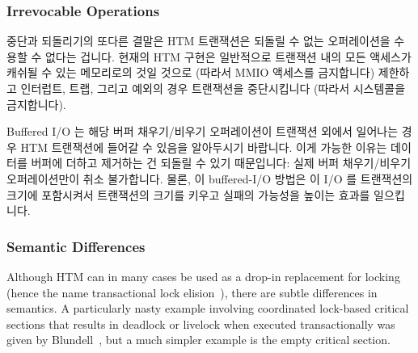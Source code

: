 \fi

\subsubsection{Irrevocable Operations}
\label{sec:future:Irrevocable Operations}

중단과 되돌리기의 또다른 결말은 HTM 트랜잭션은 되돌릴 수 없는 오퍼레이션을
수용할 수 없다는 겁니다.
현재의 HTM 구현은 일반적으로 트랜잭션 내의 모든 액세스가 캐쉬될 수 있는
메모리로의 것일 것으로 (따라서 MMIO 액세스를 금지합니다) 제한하고 인터럽트,
트랩, 그리고 예외의 경우 트랜잭션을 중단시킵니다 (따라서 시스템콜을
금지합니다).

Buffered I/O 는 해당 버퍼 채우기/비우기 오퍼레이션이 트랜잭션 외에서 일어나는
경우 HTM 트랜잭션에 들어갈 수 있음을 알아두시기 바랍니다.
이게 가능한 이유는 데이터를 버퍼에 더하고 제거하는 건 되돌릴 수 있기
때문입니다: 실제 버퍼 채우기/비우기 오퍼레이션만이 취소 불가합니다.
물론, 이 buffered-I/O 방법은 이 I/O 를 트랜잭션의 크기에 포함시켜서 트랜잭션의
크기를 키우고 실패의 가능성을 높이는 효과를 일으킵니다.

\iffalse

Another consequence of aborts and rollbacks is that HTM transactions
cannot accommodate irrevocable operations.
Current HTM implementations typically enforce this limitation by
requiring that all of the accesses in the transaction be to cacheable
memory (thus prohibiting MMIO accesses) and aborting transactions on
interrupts, traps, and exceptions (thus prohibiting system calls).

Note that buffered I/O can be accommodated by HTM transactions as
long as the buffer fill/flush operations occur extra-transactionally.
The reason that this works is that adding data to and removing data
from the buffer is revocable: Only the actual buffer fill/flush
operations are irrevocable.
Of course, this buffered-I/O approach has the effect of including the I/O
in the transaction's footprint, increasing the size of the transaction
and thus increasing the probability of failure.

\fi

\subsubsection{Semantic Differences}
\label{sec:future:Semantic Differences}

Although HTM can in many cases be used as a drop-in replacement for locking
(hence the name transactional lock
elision~\cite{DaveDice2008TransactLockElision}),
there are subtle differences in semantics.
A particularly nasty example involving coordinated lock-based critical
sections that results in deadlock or livelock when executed transactionally
was given by Blundell~\cite{Blundell2006TMdeadlock}, but a much simpler
example is the empty critical section.

